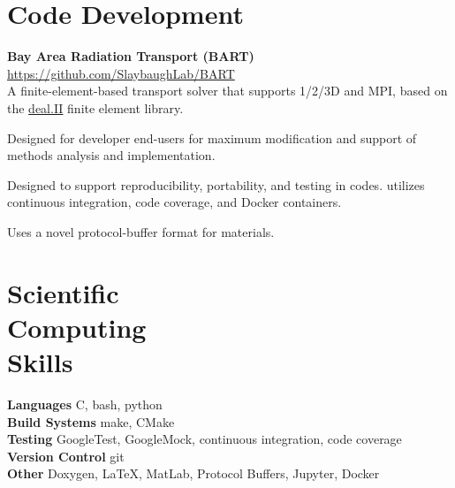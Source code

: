 \documentclass[margin,line]{resume}
\newcommand{\Cpp}[1][]{\textrm{C\nolinebreak[4]\hspace{-.05em}\raisebox{.4ex}{\tiny\bfseries++}#1}}
\begin{document}
\begin{resume}
        
        \section{\mysidestyle Code Development}
        \textbf{Bay Area Radiation Transport (BART)} \hfill
        \url{https://github.com/SlaybaughLab/BART} \\
        A finite-element-based transport solver that
                  supports 1/2/3D and MPI, based on the \href{https://www.dealii.org/}{deal.II}
                  finite element library.
                \begin{list2}
                \item Designed for developer end-users for maximum
                  modification and support of methods analysis and
                  implementation.
                \item Designed to support reproducibility,
                  portability, and testing in codes. utilizes
                  continuous integration, code coverage, and Docker
                  containers.
                \item Uses a novel protocol-buffer format for materials.
                \end{list2}
    \section{\mysidestyle Scientific\\Computing\\Skills}
                \textbf{Languages} \hfill  \Cpp{}, bash, python\vspace{.5mm}\\%
                \textbf{Build Systems} \hfill make, CMake \vspace{.5mm}\\%
                \textbf{Testing} \hfill GoogleTest, GoogleMock, continuous integration, code coverage\vspace{.5mm}\\%
                \textbf{Version Control} \hfill git\vspace{.5mm}\\%
                \textbf{Other} \hfill Doxygen, \LaTeX, MatLab,
                Protocol Buffers, Jupyter, Docker \vspace{.5mm}%





\end{resume}
\end{document}
